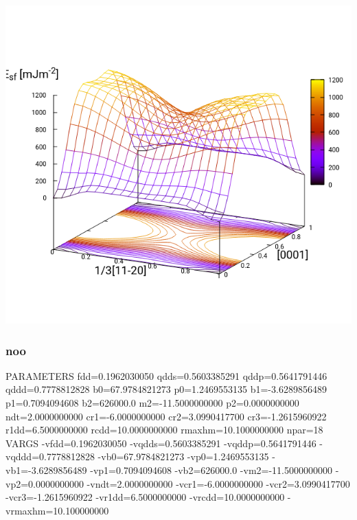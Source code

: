 \documentclass[11pt]{article}
\begin{document}
\begin{center}
\includegraphics[width=.9\linewidth]{Images/prismatic_gs_noo_2019-11-08_pris.png}
\end{center}

\subsubsection{noo}
\label{sec:org933e1b7}
PARAMETERS
  fdd=0.1962030050 qdds=0.5603385291 qddp=0.5641791446 qddd=0.7778812828 b0=67.9784821273 p0=1.2469553135 b1=-3.6289856489 p1=0.7094094608 b2=626000.0 m2=-11.5000000000 p2=0.0000000000 ndt=2.0000000000 cr1=-6.0000000000 cr2=3.0990417700 cr3=-1.2615960922 r1dd=6.5000000000 rcdd=10.0000000000 rmaxhm=10.1000000000 npar=18 
VARGS
    -vfdd=0.1962030050 -vqdds=0.5603385291 -vqddp=0.5641791446 -vqddd=0.7778812828 -vb0=67.9784821273 -vp0=1.2469553135 -vb1=-3.6289856489 -vp1=0.7094094608 -vb2=626000.0 -vm2=-11.5000000000 -vp2=0.0000000000 -vndt=2.0000000000 -vcr1=-6.0000000000 -vcr2=3.0990417700 -vcr3=-1.2615960922 -vr1dd=6.5000000000 -vrcdd=10.0000000000 -vrmaxhm=10.100000000
\end{document}

